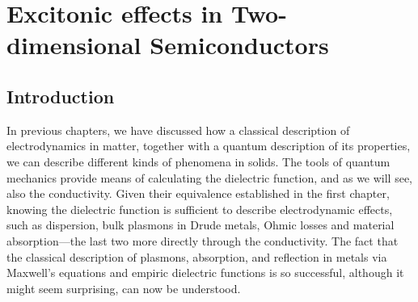 
%

\chapter{Excitonic effects in Two-dimensional Semiconductors}
\label{ch:Excitons}
\glsresetall
\section{Introduction}
\label{sec:introduction}

In previous chapters, we have discussed how a classical description of electrodynamics in matter, together with a quantum description of its properties, we can describe different kinds of phenomena in solids.
The tools of quantum mechanics provide means of calculating the dielectric function, and as we will see, also the conductivity.
Given their equivalence established in the first chapter, knowing the dielectric function is sufficient to describe electrodynamic effects, such as dispersion, bulk plasmons in Drude metals, Ohmic losses and material absorption---the last two more directly through the conductivity.
The fact that the classical description of plasmons, absorption, and reflection in metals via Maxwell's equations and empiric dielectric functions is so successful, although it might seem surprising, can now be understood.

